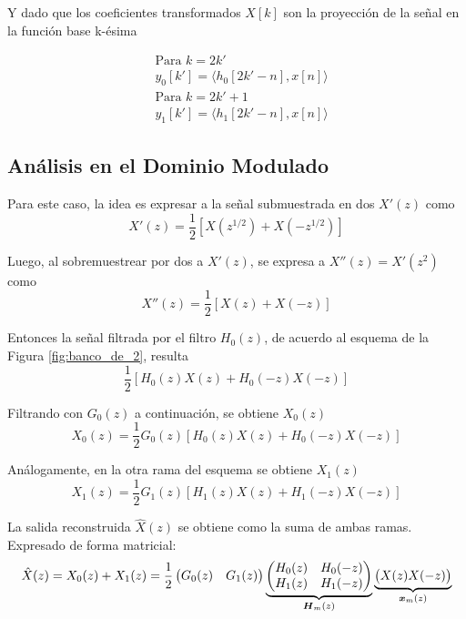 Y dado que los coeficientes transformados $X[k]$ son la proyección de la señal en la función base k-ésima
	
	\begin{align}
		&\text{Para $k=2k'$}	\nonumber \\
		&y_0[k']=\langle h_0[2k'-n], x[n]\rangle		
	\end{align}
	\begin{align}
		&\text{Para $k=2k'+1$}	\nonumber \\
		&y_1[k']=\langle h_1[2k'-n], x[n]\rangle
	\end{align}


	

\subsection{Análisis en el Dominio Modulado}

	Para este caso, la idea es expresar a la señal submuestrada en dos $X'(z)$ como
		\begin{equation}
			X'(z)=\frac{1}{2}[X(z^{1/2})+X(-z^{1/2})]
		\end{equation}

	Luego, al sobremuestrear por dos a $X'(z)$, se expresa a $X''(z)=X'(z^2)$ como
		\begin{equation}
			X''(z)=\frac{1}{2}[X(z)+X(-z)]
		\end{equation}

	Entonces la señal filtrada por el filtro $H_0(z)$, de acuerdo al esquema de la Figura \ref{fig:banco_de_2}, resulta
		\begin{equation}
			\frac{1}{2}[H_0(z)X(z)+H_0(-z)X(-z)]
		\end{equation}

	Filtrando con $G_0(z)$ a continuación, se obtiene $X_0(z)$
		\begin{equation}
			X_0(z)=\frac{1}{2}G_0(z)[H_0(z)X(z)+H_0(-z)X(-z)]
		\end{equation}

	Análogamente, en la otra rama del esquema se obtiene $X_1(z)$
		\begin{equation}
			X_1(z)=\frac{1}{2}G_1(z)[H_1(z)X(z)+H_1(-z)X(-z)]
		\end{equation}

	La salida reconstruida $\hat{X}(z)$ se obtiene como la suma de ambas ramas. Expresado de forma matricial:
		\begin{equation}
			\hat{X}(z)
			=
			X_0(z)+X_1(z)
			=
			\frac{1}{2}
			\begin{pmatrix}
				G_0(z) & G_1(z)
			\end{pmatrix}
			\underbrace{
				\begin{pmatrix}
					H_0(z) & H_0(-z) \\
					H_1(z) & H_1(-z)
				\end{pmatrix}
			}_{\boldsymbol{H}_m(z)}
			\underbrace{
				\begin{pmatrix}
					X(z) X(-z)
				\end{pmatrix}
			}_{\boldsymbol{x}_m(z)}
		\label{eq:modmat}
		\end{equation}

